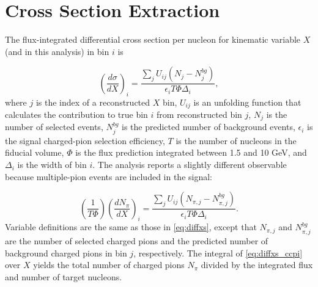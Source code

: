 \section{Cross Section Extraction}
\label{sec:xs}
The \cconepi flux-integrated differential cross section per nucleon for kinematic variable $X$ (\Tpi and \thetapi in this analysis) in bin $i$ is

\begin{equation} \label{eq:diffxs}
\left(\frac{d\sigma}{dX}\right)_{i} = \frac{\sum_{j}U_{ij}\left(N_{j} - N_{j}^{bg}\right)}{\epsilon_{i}T\Phi\Delta_{i}},
\end{equation}
where $j$ is the index of a reconstructed $X$ bin, $U_{ij}$ is an unfolding function that calculates the contribution to true bin $i$ from reconstructed bin $j$, 
$N_{j}$ is the number of selected events, $N_{j}^{bg}$ is the predicted number of background events, $\epsilon_{i}$ is the signal charged-pion selection efficiency, 
$T$ is the number of nucleons in the fiducial volume, $\Phi$ is the \numu flux prediction integrated between 1.5 and 10 GeV, and $\Delta_{i}$ is the width of 
bin $i$.  The \ccpi analysis reports a slightly different observable because multiple-pion events are included in the signal:

\begin{equation} \label{eq:diffxs_ccpi}
\left(\frac{1}{T\Phi}\right)\left(\frac{dN_{\pi}}{dX}\right)_{i} = \frac{\sum_{j}U_{ij}\left(N_{\pi,j} - N_{\pi,j}^{bg}\right)}{\epsilon_{i}T\Phi\Delta_{i}}.
\end{equation}
Variable definitions are the same as those in \eqref{eq:diffxs}, except that $N_{\pi,j}$ and 
$N_{\pi,j}^{bg}$ are the number of selected charged pions and the predicted number of background charged pions in bin $j$, respectively.  
The integral of \eqref{eq:diffxs_ccpi} over $X$ yields the total number of 
charged pions $N_{\pi}$ divided by the integrated flux  and number of target nucleons.

